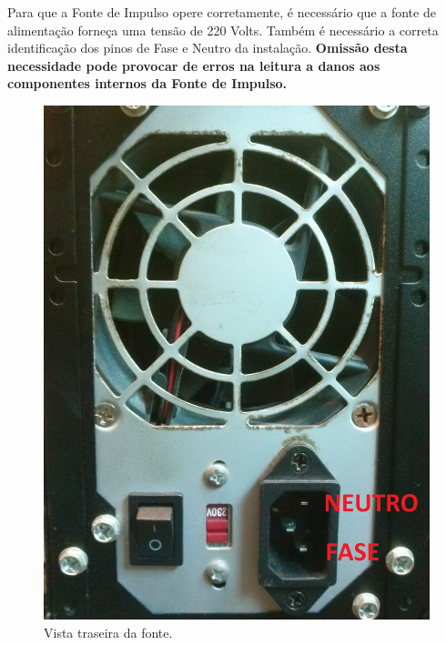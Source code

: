 \documentclass[a4paper, 10pt]{article}
\begin{document}

Para que a Fonte de Impulso opere corretamente, é necessário que a fonte de alimentação 
forneça uma tensão de 220 Volts. Também é necessário a correta 
identificação dos pinos de Fase e Neutro da instalação. \textbf{Omissão desta necessidade 
pode provocar de erros na leitura a danos aos componentes internos da Fonte de Impulso.}

\begin{figure}[!h]
        \caption{\label{fig_vista_traseira_fonte} Vista traseira da fonte.}
	    \begin{center}
            \includegraphics[scale=0.08]{../fotos/fonte_alimentacao.jpg}
	    \end{center}
\end{figure}
\end{document}
